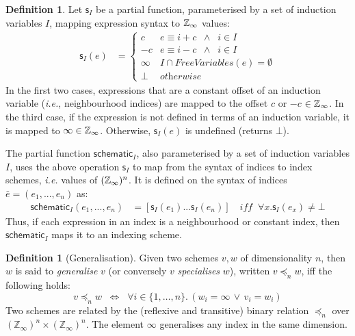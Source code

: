 \documentclass[10pt,preprint]{sigplanconf}
\newcounter{block}
\theoremstyle{definition}
\newtheorem{definition}[block]{Definition}
\newcommand{\ie}{\emph{i.e.}}
\begin{document}
\newcommand{\schemeOne}{\textsf{s}_I}
\newcommand{\schemeN}{\textsf{schematic}_I}
\begin{definition}%
\label{def:schematic}
Let $\schemeOne$ be a partial function, parameterised by a set of
induction variables $I$, mapping expression syntax to
$\mathbb{Z}_\infty$ values:
\begin{align*}
\schemeOne(e)
 & =  \begin{cases}
c & e \equiv i + c \;\; \wedge \;\; i \in I \\
-c & e \equiv i - c \;\; \wedge \;\; i \in I \\
\infty & \textit{$I \cap \textit{FreeVariables}(e) = \emptyset $} \\
\bot   & \textit{otherwise}
\end{cases}
\end{align*}
In the
first two cases, expressions that are a constant offset of an
induction variable (\ie{}, neighbourhood indices) are mapped to the
offset $c$ or $-c$ $\in \mathbb{Z}_\infty$. In the third case, if the
expression is not defined in terms of an induction variable, it
is mapped to $\infty \in \mathbb{Z}_\infty{}$. Otherwise, $\schemeOne(e)$
is undefined (returns $\bot$).

The partial function $\schemeN$, also parameterised by a set of
induction variables $I$, uses the above operation $\schemeOne$ to
 map from the syntax of indices to index schemes, \ie{} values of
$(\mathbb{Z}_\infty)^n$. It is defined on the syntax of indices $\bar{e} = (e_1, ..., e_n)$ as:
\begin{align*}
\schemeN(e_1, ..., e_n) & =
[\schemeOne(e_1) ... \schemeOne(e_n) ]
\quad \textit{iff} \;\; \forall x . \schemeOne(e_x) \neq \bot
\end{align*}
%
Thus, if each expression in an index is a neighbourhood or constant
index, then $\schemeN$ maps it to an indexing scheme.
\end{definition}

\begin{definition}[Generalisation]
Given two schemes $v, w$ of dimensionality $n$,
then $w$ is said to \emph{generalise} $v$
(or conversely $v$ \emph{specialises} $w$),
written $v \preceq_n w$, iff the following holds:
\[
v \preceq_n w \;\; \Leftrightarrow  \;\;
  \forall i\!\in\!\{ 1, \ldots, n \} . \, (w_i = \infty \, \vee \, v_i = w_i)
\]
Two schemes are related by the (reflexive and transitive) binary relation
$\preceq_n$ over $(\mathbb{Z}_{\infty})^n \times (\mathbb{Z}_{\infty})^n$.
The element $\infty$ generalises any index in the same dimension.
%
\end{definition}
\end{document}
